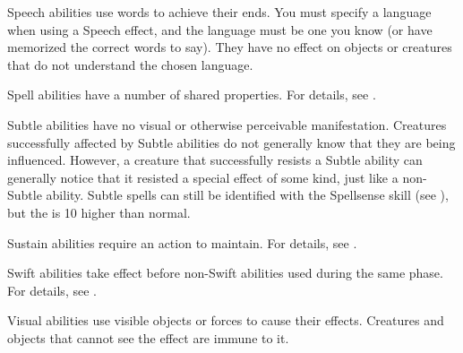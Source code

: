  Speech abilities use words to achieve their ends.
You must specify a language when using a Speech effect, and the language must be one you know (or have memorized the correct words to say). They have no effect on objects or creatures that do not understand the chosen language.

 Spell abilities have a number of shared properties.
For details, see .

 Subtle abilities have no visual or otherwise perceivable manifestation.
Creatures successfully affected by Subtle abilities do not generally know that they are being influenced.
However, a creature that successfully resists a Subtle ability can generally notice that it resisted a special effect of some kind, just like a non-Subtle ability.
Subtle spells can still be identified with the Spellsense skill (see ), but the  is 10 higher than normal.

 Sustain abilities require an action to maintain. For details, see .

 Swift abilities take effect before non-Swift abilities used during the same phase.
For details, see .

 Visual abilities use visible objects or forces to cause their effects.
Creatures and objects that cannot see the effect are immune to it.
